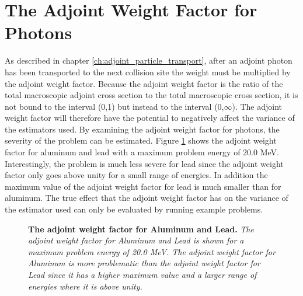 \section{The Adjoint Weight Factor for Photons}
As described in chapter \ref{ch:adjoint_particle_transport}, after an adjoint
photon has been transported to the next collision site the weight must be 
multiplied by the adjoint weight factor. Because the adjoint weight factor
is the ratio of the total macroscopic adjoint cross section to the total
macroscopic cross section, it is not bound to the interval (0,1) but instead
to the interval (0,$\infty$). The adjoint weight factor will therefore have the
potential to negatively affect the variance of the estimators used. By examining
the adjoint weight factor for photons, the severity of the problem can be 
estimated. Figure \ref{fig:adjoint_weight_factor} shows the adjoint weight 
factor for aluminum and lead with a maximum problem energy of 20.0 MeV. 
Interestingly, the problem is much less severe for lead since the adjoint 
weight factor only goes above unity for a small range of energies. In addition
the maximum value of the adjoint weight factor for lead is much smaller than
for aluminum. The true effect that the adjoint weight factor has on the 
variance of the estimator used can only be evaluated by running example 
problems.
\begin{figure}[t!]
  \begin{center}
  \end{center}
  \caption{\textbf{The adjoint weight factor for Aluminum and Lead.}
    \textit{The adjoint weight factor for Aluminum and Lead is shown for a
      maximum problem energy of 20.0 MeV. The adjoint weight factor for 
      Aluminum is more problematic than the adjoint weight factor for Lead
      since it has a higher maximum value and a larger range of energies where
      it is above unity.}}
  \label{fig:adjoint_weight_factor}
\end{figure}
